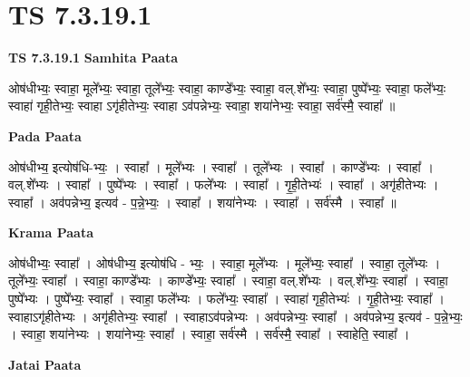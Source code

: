 \documentclass[17pt]{extarticle}
\begin{document}
\section{ TS 7.3.19.1 }

\textbf{TS 7.3.19.1 } \newline
\textbf{Samhita Paata} \newline

ओष॑धीभ्यः॒ स्वाहा॒ मूले᳚भ्यः॒ स्वाहा॒ तूले᳚भ्यः॒ स्वाहा॒ काण्डे᳚भ्यः॒ स्वाहा॒ वल्.शे᳚भ्यः॒ स्वाहा॒ पुष्पे᳚भ्यः॒ स्वाहा॒ फले᳚भ्यः॒ स्वाहा॑ गृही॒तेभ्यः॒ स्वाहा ऽगृ॑हीतेभ्यः॒ स्वाहा ऽव॑पन्नेभ्यः॒ स्वाहा॒ शया॑नेभ्यः॒ स्वाहा॒ सर्व॑स्मै॒ स्वाहा᳚ ॥ \newline

\textbf{Pada Paata} \newline

ओष॑धीभ्य॒ इत्योष॑धि-भ्यः॒ । स्वाहा᳚ । मूले᳚भ्यः । स्वाहा᳚ । तूले᳚भ्यः । स्वाहा᳚ । काण्डे᳚भ्यः । स्वाहा᳚ । वल्.शे᳚भ्यः । स्वाहा᳚ । पुष्पे᳚भ्यः । स्वाहा᳚ । फले᳚भ्यः । स्वाहा᳚ । गृ॒ही॒तेभ्यः॑ । स्वाहा᳚ । अगृ॑हीतेभ्यः । स्वाहा᳚ । अव॑पन्नेभ्य॒ इत्यव॑ - प॒न्ने॒भ्यः॒ । स्वाहा᳚ । शया॑नेभ्यः । स्वाहा᳚ । सर्व॑स्मै । स्वाहा᳚ ॥  \newline


\textbf{Krama Paata} \newline

ओष॑धीभ्यः॒ स्वाहा᳚ । ओष॑धीभ्य॒ इत्योष॑धि - भ्यः॒ । स्वाहा॒ मूले᳚भ्यः । मूले᳚भ्यः॒ स्वाहा᳚ । स्वाहा॒ तूले᳚भ्यः । तूले᳚भ्यः॒ स्वाहा᳚ । स्वाहा॒ काण्डे᳚भ्यः । काण्डे᳚भ्यः॒ स्वाहा᳚ । स्वाहा॒ वल्.शे᳚भ्यः । वल्.शे᳚भ्यः॒ स्वाहा᳚ । स्वाहा॒ पुष्पे᳚भ्यः । पुष्पे᳚भ्यः॒ स्वाहा᳚ । स्वाहा॒ फले᳚भ्यः । फले᳚भ्यः॒ स्वाहा᳚ । स्वाहा॑ गृही॒तेभ्यः॑ । गृ॒ही॒तेभ्यः॒ स्वाहा᳚ । स्वाहाऽगृ॑हीतेभ्यः । अगृ॑हीतेभ्यः॒ स्वाहा᳚ । स्वाहाऽव॑पन्नेभ्यः । अव॑पन्नेभ्यः॒ स्वाहा᳚ । अव॑पन्नेभ्य॒ इत्यव॑ - प॒न्ने॒भ्यः॒ । स्वाहा॒ शया॑नेभ्यः । शया॑नेभ्यः॒ स्वाहा᳚ । स्वाहा॒ सर्व॑स्मै । सर्व॑स्मै॒ स्वाहा᳚ । स्वाहेति॒ स्वाहा᳚ । \newline

\textbf{Jatai Paata} \newline
\end{document}
